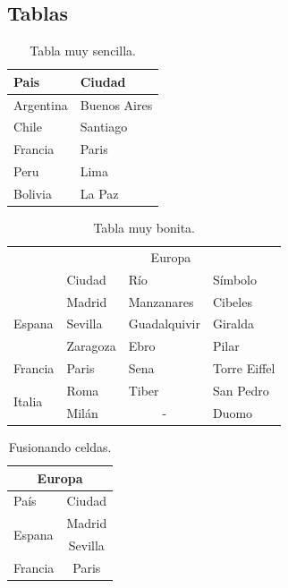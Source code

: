 \documentclass[12pt,letterpaper]{article}
\begin{document}
\subsection{Tablas}

\begin{table}[htbp]
\begin{center}
\begin{tabular}{|l|l|}
\hline
Pais & Ciudad \\
\hline \hline
Argentina & Buenos Aires \\ \hline
Chile & Santiago \\ \hline
Francia & Paris \\ \hline
Peru & Lima \\ \hline
Bolivia  & La Paz \\ \hline

\end{tabular}
\caption{Tabla muy sencilla.}
\label{tabla:sencilla}
\end{center}
\end{table}



\begin{table}[htb]
\centering
\begin{tabular}{|l|l|l|l|}
\hline
& \multicolumn{3}{c|}{Europa} \\
\cline{2-4}
& Ciudad & Río & Símbolo\\
\hline \hline
\multirow{3}{1cm}{Espana} & Madrid & Manzanares & Cibeles\\ \cline{2-4}
& Sevilla & Guadalquivir & Giralda\\ \cline{2-4}
& Zaragoza & Ebro & Pilar\\ \cline{1-4}
Francia & Paris & Sena & Torre Eiffel\\ \cline{1-4}
\multirow{2}{1cm}{Italia} & Roma & Tiber & San Pedro\\ \cline{2-4}
& Milán & \multicolumn{1}{c|}{-} & Duomo\\ \cline{1-4}
\end{tabular}
\caption{Tabla muy bonita.}
\label{tabla:final}
\end{table}







\begin{table}[htb]
\centering
\begin{tabular}{|l|c|}
\hline
\multicolumn{2}{|c|}{Europa} \\
\hline
País & Ciudad \\
\hline \hline
\multirow{2}{1cm}{Espana} & Madrid \\ \cline{2-2}
& Sevilla \\ \hline
Francia & Paris \\ \hline
\end{tabular}
\caption{Fusionando celdas.}
\label{tabla:fusionandoceldas}
\end{table}
\end{document}
